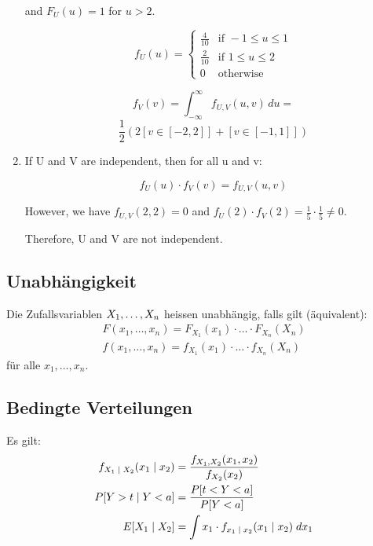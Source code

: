 \begin{tiny}
\begin{enumerate}[noitemsep,topsep=0pt,parsep=0pt,partopsep=0pt]
          and $F_U(u) = 1$ for $u > 2$.

          \[
            f_U(u) = \begin{cases}
              \frac{4}{10} & \text{if } -1 \leq u \leq 1 \\
              \frac{2}{10} & \text{if } 1 \leq u \leq 2  \\
              0            & \text{otherwise}
            \end{cases}
          \]

          \[
            f_V(v) = \int_{-\infty}^{\infty} f_{U,V}(u,v) \, du =
          \]
          \[
            \frac{1}{2}\left(2[v \in [-2,2]] + [v \in [-1,1]]\right)
          \]

    \item If U and V are independent, then for all u and v:

          \[
            f_U(u) \cdot f_V(v) = f_{U,V}(u,v)
          \]

          However, we have \(f_{U,V}(2,2) = 0\) and \(f_U(2) \cdot f_V(2) = \frac{1}{5}
          \cdot \frac{1}{5} \neq 0\).

          Therefore, U and V are not independent.
  \end{enumerate}
\end{tiny}
\BoxEnd{}
\subsection{Unabhängigkeit}
Die Zufallsvariablen $X_1, \dots, X_n$ heissen unabhängig, falls gilt
(äquivalent):
\begin{align*}
  F (x_1, \dots, x_n) = F_{X_1} (x_1) \cdot \hdots \cdot F_{X_n} (X_n) \\
  f (x_1, \dots, x_n) = f_{X_1} (x_1) \cdot \hdots \cdot f_{X_n} (X_n)
\end{align*}
für alle $x_1, \dots, x_n$.
\subsection{Bedingte Verteilungen}
Es gilt:
\begin{align*}
  f_{X_1 \; | \; X_2} (x_1 \; | \; x_2) & = \frac{f_{X_1,  X_2} (x_1,  x_2)}{f_{X_2} (x_2)}              \\
  P[Y > t \; | \; Y < a]                   & = \frac{P[t < Y < a]}{P[Y < a]}                                \\
  E[X_1 \; | \; X_2]                    & = \int x_1 \cdot f_{x_1 \; | \; x_2} (x_1 \; | \; x_2) \; dx_1
\end{align*}
